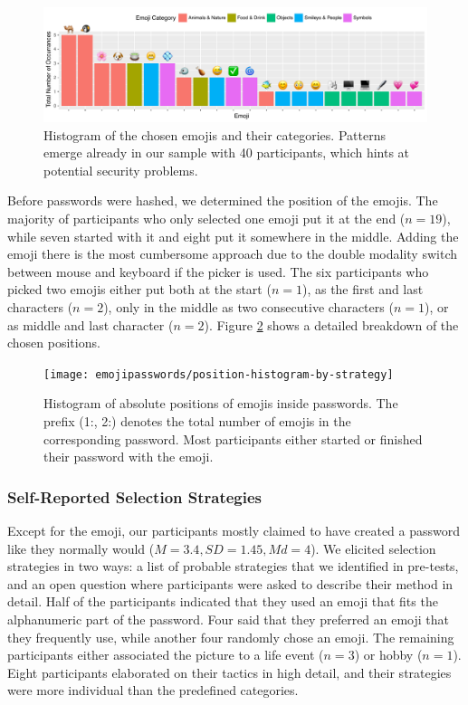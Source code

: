 \begin{figure}
	\centering
	\includegraphics[width=\linewidth]{figures/emojipasswords/emoji-distribution-histogram}
	\caption{\label{fig:emojipasswords:distribution-histogram} Histogram of the chosen emojis and their categories. Patterns emerge already in our sample with 40 participants, which hints at potential security problems.}
\end{figure}


Before passwords were hashed, we determined the position of the emojis. The majority of participants who only selected one emoji put it at the end ($n=19$), while seven started with it and eight put it somewhere in the middle. Adding the emoji there is the most cumbersome approach due to the double modality switch between mouse and keyboard if the picker is used. The six participants who picked two emojis either put both at the start ($n=1$), as the first and last characters ($n=2$), only in the middle as two consecutive characters ($n=1$), or as middle and last character ($n=2$). Figure \ref{fig:emojipasswords:position-histogram-by-strategy} shows a detailed breakdown of the chosen positions. 
\begin{figure}
	\centering
	\texttt{[image: emojipasswords/position-histogram-by-strategy]}
	\caption{\label{fig:emojipasswords:position-histogram-by-strategy} Histogram of absolute positions of emojis inside passwords. The prefix (1:, 2:) denotes the total number of emojis in the corresponding password. Most participants either started or finished their password with the emoji.}
\end{figure}


\subsubsection{Self-Reported Selection Strategies}
Except for the emoji, our participants mostly claimed to have created a password like they normally would ($M=3.4, SD=1.45, Md=4$). 
We elicited selection strategies in two ways: a list of probable strategies that we identified in pre-tests, and an open question where participants were asked to describe their method in detail. Half of the participants indicated that they used an emoji that fits the alphanumeric part of the password. Four said that they preferred an emoji that they frequently use, while another four randomly chose an emoji. The remaining participants either associated the picture to a life event ($n=3$) or hobby ($n=1$). Eight participants elaborated on their tactics in high detail, and their strategies were more individual than the predefined categories. 

